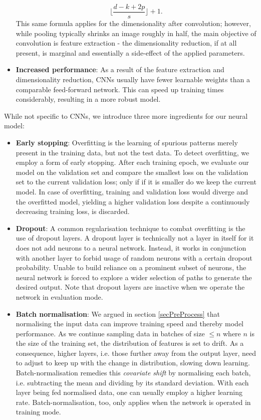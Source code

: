 \documentclass[british,12p]{article}
\begin{document}
\begin{itemize}
    	$$\big\lfloor\frac{d - k + 2p}{s}\big\rfloor + 1.$$
    	This same formula applies for the dimensionality after convolution; however, while pooling typically shrinks an image roughly in half, the main objective of convolution is feature extraction - the dimensionality reduction, if at all present, is marginal and essentially a side-effect of the applied parameters. 
    	\item \textbf{Increased performance}: As a result of the feature extraction and dimensionality reduction, CNNs usually have fewer learnable weights than a comparable feed-forward network. This can speed up training times considerably, resulting in a more robust model.
    \end{itemize}
    
    While not specific to CNNs, we introduce three more ingredients for our neural model:
    \begin{itemize}
    	\item \textbf{Early stopping}: Overfitting is the learning of spurious patterns merely present in the training data, but not the test data. To detect overfitting, we employ a form of early stopping. After each training epoch, we evaluate our model on the validation set and compare the smallest loss on the validation set to the current validation loss; only if if it is smaller do we keep the current model. In case of overfitting, training and validation loss would diverge and the overfitted model, yielding a higher validation loss despite a continuously decreasing training loss, is discarded.
        \item \textbf{Dropout}:	A common regularisation technique to combat overfitting is the use of dropout layers. A dropout layer is technically not a layer in itself for it does not add neurons to a neural network. Instead, it works in conjunction with another layer to forbid usage of random neurons with a certain dropout probability. Unable to build reliance on a prominent subset of neurons, the neural network is forced to explore a wider selection of paths to generate the desired output. Note that dropout layers are inactive when we operate the network in evaluation mode. 
    	\item \textbf{Batch normalisation}: We argued in section \ref{secPreProcess} that normalising the input data can improve training speed and thereby model performance. As we continue sampling data in batches of size $\le n$ where $n$ is the size of the training set, the distribution of features is set to drift. As a consequence, higher layers, i.e. those further away from the output layer, need to adjust to keep up with the change in distribution, slowing down learning. Batch-normalisation remedies this \textit{covariate shift} by normalising each batch, i.e. subtracting the mean and dividing by its standard deviation. With each layer being fed normalised data, one can usually employ a higher learning rate. Batch-normalisation, too, only applies when the network is operated in training mode.
    \end{itemize}
    
\end{document}
